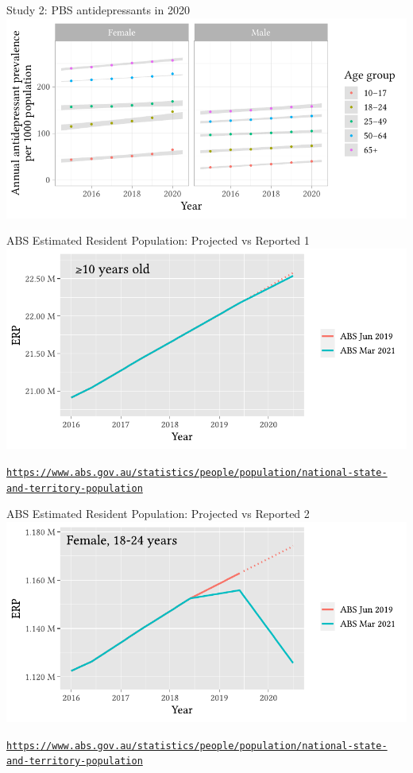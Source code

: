\documentclass[aspectratio=169,12pt]{beamer} %
\begin{document}
\begin{frame}{Study 2: PBS antidepressants in 2020}
\centering
\includegraphics[height=0.8\textheight]
        {ref/covid19mh-prev-age.pdf}
	\nocite{costa_2023}
\end{frame}

\begin{frame}{ABS Estimated Resident Population: Projected vs Reported 1}
	\center\includegraphics[height=0.75\textheight]{ref/pops-overall.pdf}
	\begin{flushright}\tiny\texttt{\url{https://www.abs.gov.au/statistics/people/population/national-state-and-territory-population}}\end{flushright}
\end{frame}

\begin{frame}{ABS Estimated Resident Population: Projected vs Reported 2}
	\center\includegraphics[height=0.75\textheight]{ref/pops-f18-24.pdf}
	\begin{flushright}\tiny\texttt{\url{https://www.abs.gov.au/statistics/people/population/national-state-and-territory-population}}\end{flushright}
\end{frame}
\end{document}
